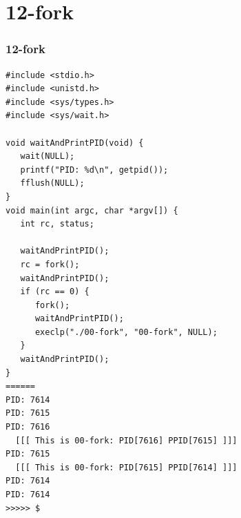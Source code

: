 \documentclass[xcolor=table, notheorems, hyperref={pdfpagelabels=false}]{beamer}
\begin{document}
\section{12-fork}
\begin{frame}[fragile]
\frametitle{12-fork}
\begin{lstlisting}[basicstyle=\ttfamily\tiny]
#include <stdio.h>
#include <unistd.h>
#include <sys/types.h>
#include <sys/wait.h>

void waitAndPrintPID(void) {
   wait(NULL);
   printf("PID: %d\n", getpid());
   fflush(NULL);
}
void main(int argc, char *argv[]) {
   int rc, status;

   waitAndPrintPID();
   rc = fork();
   waitAndPrintPID();
   if (rc == 0) {
      fork();
      waitAndPrintPID();
      execlp("./00-fork", "00-fork", NULL);
   }
   waitAndPrintPID();
}
======
PID: 7614
PID: 7615
PID: 7616
  [[[ This is 00-fork: PID[7616] PPID[7615] ]]]
PID: 7615
  [[[ This is 00-fork: PID[7615] PPID[7614] ]]]
PID: 7614
PID: 7614
>>>>> $ 

\end{lstlisting}
\end{frame}

\end{document}
